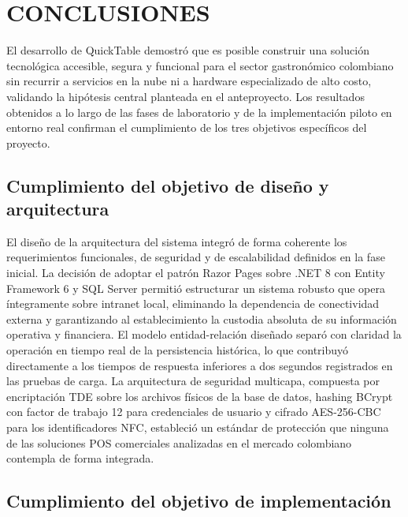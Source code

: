 \chapter{CONCLUSIONES}

El desarrollo de QuickTable demostró que es posible construir una solución tecnológica
accesible, segura y funcional para el sector gastronómico colombiano sin recurrir a
servicios en la nube ni a hardware especializado de alto costo, validando la hipótesis
central planteada en el anteproyecto. Los resultados obtenidos a lo largo de las fases
de laboratorio y de la implementación piloto en entorno real confirman el cumplimiento
de los tres objetivos específicos del proyecto.

\section*{Cumplimiento del objetivo de diseño y arquitectura}

El diseño de la arquitectura del sistema integró de forma coherente los requerimientos
funcionales, de seguridad y de escalabilidad definidos en la fase inicial. La decisión
de adoptar el patrón Razor Pages sobre .NET 8 con Entity Framework 6 y SQL Server
permitió estructurar un sistema robusto que opera íntegramente sobre intranet local,
eliminando la dependencia de conectividad externa y garantizando al establecimiento la
custodia absoluta de su información operativa y financiera. El modelo entidad-relación
diseñado separó con claridad la operación en tiempo real de la persistencia histórica,
lo que contribuyó directamente a los tiempos de respuesta inferiores a dos segundos
registrados en las pruebas de carga. La arquitectura de seguridad multicapa, compuesta
por encriptación TDE sobre los archivos físicos de la base de datos, hashing BCrypt
con factor de trabajo 12 para credenciales de usuario y cifrado AES-256-CBC para los
identificadores NFC, estableció un estándar de protección que ninguna de las soluciones
POS comerciales analizadas en el mercado colombiano contempla de forma integrada.

\section*{Cumplimiento del objetivo de implementación}

